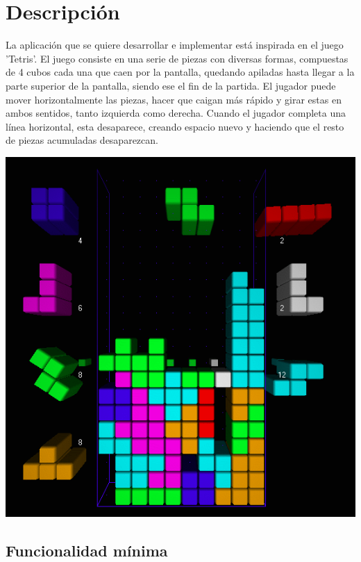 \documentclass[11pt,a4paper]{article}
\begin{document}
\section{Descripción}

\begin{multicols}{2}

La aplicación que se quiere desarrollar e implementar está inspirada en el juego 'Tetris'. El juego consiste en una serie de piezas con diversas formas, compuestas de 4 cubos cada una que caen por la pantalla, quedando apiladas hasta llegar a la parte superior de la pantalla, siendo ese el fin de la partida. El jugador puede mover horizontalmente las piezas, hacer que caigan más rápido y girar estas en ambos sentidos, tanto izquierda como derecha. Cuando el jugador completa una línea horizontal, esta desaparece, creando espacio nuevo y haciendo que el resto de piezas acumuladas desaparezcan. 

\includegraphics[scale=0.32]{tetris.png}

\end{multicols}

\subsection{Funcionalidad mínima}
\end{document}
